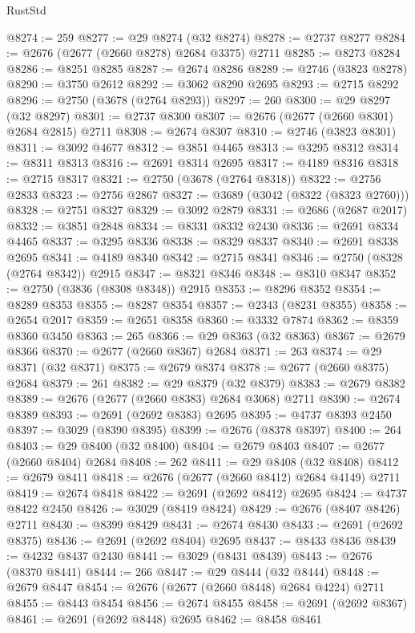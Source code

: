 \begin{lexlean}{RustStd}
\begin{coremodule}
@8274 := 259
@8277 := @29 @8274 (@32 @8274)
@8278 := @2737 @8277
@8284 := @2676 (@2677 (@2660 @8278) @2684 @3375) @2711
@8285 := @8273 @8284
@8286 := @8251 @8285
@8287 := @2674 @8286
@8289 := @2746 (@3823 @8278)
@8290 := @3750 @2612
@8292 := @3062 @8290 @2695
@8293 := @2715 @8292
@8296 := @2750 (@3678 (@2764 @8293))
@8297 := 260
@8300 := @29 @8297 (@32 @8297)
@8301 := @2737 @8300
@8307 := @2676 (@2677 (@2660 @8301) @2684 @2815) @2711
@8308 := @2674 @8307
@8310 := @2746 (@3823 @8301)
@8311 := @3092 @4677
@8312 := @3851 @4465
@8313 := @3295 @8312
@8314 := @8311 @8313
@8316 := @2691 @8314 @2695
@8317 := @4189 @8316
@8318 := @2715 @8317
@8321 := @2750 (@3678 (@2764 @8318))
@8322 := @2756 @2833
@8323 := @2756 @2867
@8327 := @3689 (@3042 (@8322 (@8323 @2760)))
@8328 := @2751 @8327
@8329 := @3092 @2879
@8331 := @2686 (@2687 @2017)
@8332 := @3851 @2848
@8334 := @8331 @8332 @2430
@8336 := @2691 @8334 @4465
@8337 := @3295 @8336
@8338 := @8329 @8337
@8340 := @2691 @8338 @2695
@8341 := @4189 @8340
@8342 := @2715 @8341
@8346 := @2750 (@8328 (@2764 @8342)) @2915
@8347 := @8321 @8346
@8348 := @8310 @8347
@8352 := @2750 (@3836 (@8308 @8348)) @2915
@8353 := @8296 @8352
@8354 := @8289 @8353
@8355 := @8287 @8354
@8357 := @2343 (@8231 @8355)
@8358 := @2654 @2017
@8359 := @2651 @8358
@8360 := @3332 @7874
@8362 := @8359 @8360 @3450
@8363 := 265
@8366 := @29 @8363 (@32 @8363)
@8367 := @2679 @8366
@8370 := @2677 (@2660 @8367) @2684
@8371 := 263
@8374 := @29 @8371 (@32 @8371)
@8375 := @2679 @8374
@8378 := @2677 (@2660 @8375) @2684
@8379 := 261
@8382 := @29 @8379 (@32 @8379)
@8383 := @2679 @8382
@8389 := @2676 (@2677 (@2660 @8383) @2684 @3068) @2711
@8390 := @2674 @8389
@8393 := @2691 (@2692 @8383) @2695
@8395 := @4737 @8393 @2450
@8397 := @3029 (@8390 @8395)
@8399 := @2676 (@8378 @8397)
@8400 := 264
@8403 := @29 @8400 (@32 @8400)
@8404 := @2679 @8403
@8407 := @2677 (@2660 @8404) @2684
@8408 := 262
@8411 := @29 @8408 (@32 @8408)
@8412 := @2679 @8411
@8418 := @2676 (@2677 (@2660 @8412) @2684 @4149) @2711
@8419 := @2674 @8418
@8422 := @2691 (@2692 @8412) @2695
@8424 := @4737 @8422 @2450
@8426 := @3029 (@8419 @8424)
@8429 := @2676 (@8407 @8426) @2711
@8430 := @8399 @8429
@8431 := @2674 @8430
@8433 := @2691 (@2692 @8375)
@8436 := @2691 (@2692 @8404) @2695
@8437 := @8433 @8436
@8439 := @4232 @8437 @2430
@8441 := @3029 (@8431 @8439)
@8443 := @2676 (@8370 @8441)
@8444 := 266
@8447 := @29 @8444 (@32 @8444)
@8448 := @2679 @8447
@8454 := @2676 (@2677 (@2660 @8448) @2684 @4224) @2711
@8455 := @8443 @8454
@8456 := @2674 @8455
@8458 := @2691 (@2692 @8367)
@8461 := @2691 (@2692 @8448) @2695
@8462 := @8458 @8461

\end{coremodule}
\end{lexlean}
